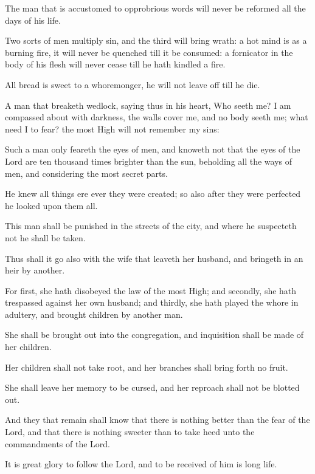 {\par }{\PP {}The man that is accustomed to opprobrious words will never be reformed all the days of his life.
\par }{\PP {}Two sorts of men multiply sin, and the third will bring wrath: a hot mind is as a burning fire, it will never be quenched till it be consumed: a fornicator in the body of his flesh will never cease till he hath kindled a fire.
\par }{\PP {}All bread is sweet to a whoremonger, he will not leave off till he die.
\par }{\PP {}A man that breaketh wedlock, saying thus in his heart, Who seeth me? I am compassed about with darkness, the walls cover me, and no body seeth me; what need I to fear? the most High will not remember my sins:
\par }{\PP {}Such a man only feareth the eyes of men, and knoweth not that the eyes of the Lord are ten thousand times brighter than the sun, beholding all the ways of men, and considering the most secret parts.
\par }{\PP {}He knew all things ere ever they were created; so also after they were perfected he looked upon them all.
\par }{\PP {}This man shall be punished in the streets of the city, and where he suspecteth not he shall be taken.
\par }{\PP {}Thus shall it go also with the wife that leaveth her husband, and bringeth in an heir by another.
\par }{\PP {}For first, she hath disobeyed the law of the most High; and secondly, she hath trespassed against her own husband; and thirdly, she hath played the whore in adultery, and brought children by another man.
\par }{\PP {}She shall be brought out into the congregation, and inquisition shall be made of her children.
\par }{\PP {}Her children shall not take root, and her branches shall bring forth no fruit.
\par }{\PP {}She shall leave her memory to be cursed, and her reproach shall not be blotted out.
\par }{\PP {}And they that remain shall know that there is nothing better than the fear of the Lord, and that there is nothing sweeter than to take heed unto the commandments of the Lord.
\par }{\PP {}It is great glory to follow the Lord, and to be received of him is long life.

}
